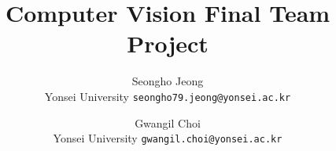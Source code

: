 \documentclass[10pt,twocolumn,letterpaper]{article}
\title{Computer Vision Final Team Project}
\author{Seongho Jeong
\\Yonsei University
{\tt\small seongho79.jeong@yonsei.ac.kr}
\and
Gwangil Choi
\\Yonsei University
{\tt\small 	gwangil.choi@yonsei.ac.kr}
}
\begin{document}
\maketitle
    

%
%
{
    \small
    
    
}

% 
\end{document}
